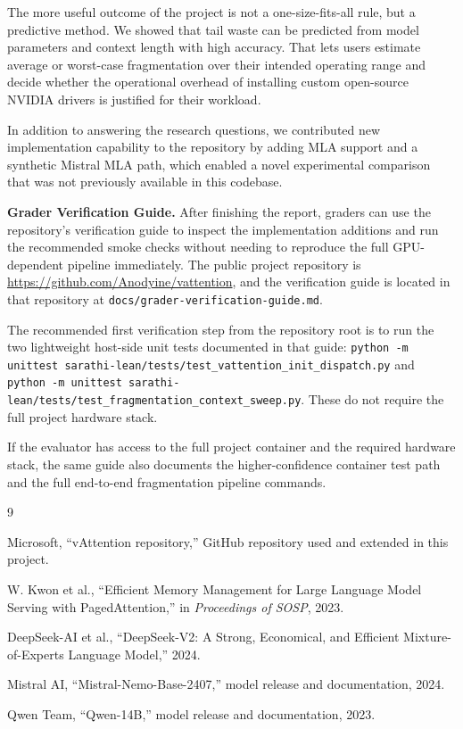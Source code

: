 \documentclass[conference]{IEEEtran}
\begin{document}
The more useful outcome of the project is not a one-size-fits-all rule, but a predictive method. We showed that tail waste can be predicted from model parameters and context length with high accuracy. That lets users estimate average or worst-case fragmentation over their intended operating range and decide whether the operational overhead of installing custom open-source NVIDIA drivers is justified for their workload.

In addition to answering the research questions, we contributed new implementation capability to the repository by adding MLA support and a synthetic Mistral MLA path, which enabled a novel experimental comparison that was not previously available in this codebase.

\appendix
\noindent\textbf{Grader Verification Guide.}
After finishing the report, graders can use the repository's
verification guide to inspect the implementation additions and run the
recommended smoke checks without needing to reproduce the full GPU-dependent
pipeline immediately. The public project repository is
\url{https://github.com/Anodyine/vattention}, and the verification guide is
located in that repository at \texttt{docs/grader-verification-guide.md}.

The recommended first verification step from the repository root is to run the
two lightweight host-side unit tests documented in that guide:
\texttt{python -m unittest sarathi-lean/tests/test\_vattention\_init\_dispatch.py}
and
\texttt{python -m unittest sarathi-lean/tests/test\_fragmentation\_context\_sweep.py}.
These do not require the full project hardware stack.

If the evaluator has access to the full project container and the required
hardware stack, the same guide also documents the higher-confidence container
test path and the full end-to-end fragmentation pipeline commands.

\begin{thebibliography}{9}

Microsoft, ``vAttention repository,'' GitHub repository used and extended in this project.

W. Kwon et al., ``Efficient Memory Management for Large Language Model Serving with PagedAttention,'' in \emph{Proceedings of SOSP}, 2023.

DeepSeek-AI et al., ``DeepSeek-V2: A Strong, Economical, and Efficient Mixture-of-Experts Language Model,'' 2024.

Mistral AI, ``Mistral-Nemo-Base-2407,'' model release and documentation, 2024.

Qwen Team, ``Qwen-14B,'' model release and documentation, 2023.

\end{thebibliography}
\end{document}
